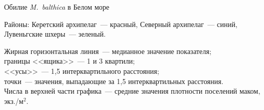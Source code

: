 \documentclass{beamer}
\begin{document}
\begin{frame}{Обилие {\it M.~balthica} в Белом море}
\begin{minipage}[t]{.49\linewidth}
\begin{center}
		\end{center}
	\end{minipage}


{\scriptsize Районы: Керетский архипелаг~--- красный, Северный архипелаг~--- синий, Лувеньгские шхеры~--- зеленый.}\\[1ex]
\begin{tiny} 
Жирная горизонтальная линия~--- медианное значение показателя;\\
границы <<ящика>>~--- 1 и 3 квартили;\\ <<усы>>~--- 1,5 интерквартильного расстояния;\\ 
точки~--- значения, выпадающие за 1,5 интерквартильных расстояния.\\ 
Числа в верхней части графика~--- средние значения плотности поселений маком, экз./м$^2$.
\end{tiny}

\end{frame}
\end{document}
